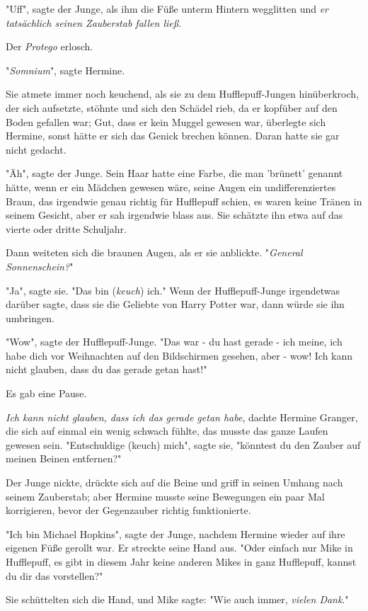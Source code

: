 {"Uff", sagte der Junge, als ihm die Füße unterm Hintern wegglitten und \emph{er tatsächlich seinen Zauberstab fallen ließ}.

Der \emph{Protego} erlosch.

"\emph{Somnium}", sagte Hermine.

Sie atmete immer noch keuchend, als sie zu dem Hufflepuff-Jungen hinüberkroch, der sich aufsetzte, stöhnte und sich den Schädel rieb, da er kopfüber auf den Boden gefallen war; Gut, dass er kein Muggel gewesen war, überlegte sich Hermine, sonst hätte er sich das Genick brechen können. Daran hatte sie gar nicht gedacht.

"Äh", sagte der Junge. Sein Haar hatte eine Farbe, die man 'brünett' genannt hätte, wenn er ein Mädchen gewesen wäre, seine Augen ein undifferenziertes Braun, das irgendwie genau richtig für Hufflepuff schien, es waren keine Tränen in seinem Gesicht, aber er sah irgendwie blass aus. Sie schätzte ihn etwa auf das vierte oder dritte Schuljahr.

Dann weiteten sich die braunen Augen, als er sie anblickte. "\emph{General Sonnenschein?}"

"Ja", sagte sie. "Das bin (\emph{keuch}) ich." Wenn der Hufflepuff-Junge irgendetwas darüber sagte, dass sie die Geliebte von Harry Potter war, dann würde sie ihn umbringen.

"Wow", sagte der Hufflepuff-Junge. "Das war - du hast gerade - ich meine, ich habe dich vor Weihnachten auf den Bildschirmen gesehen, aber - wow! Ich kann nicht glauben, dass du das gerade getan hast!"

Es gab eine Pause.

\emph{Ich kann nicht glauben, dass ich das gerade getan habe}, dachte Hermine Granger, die sich auf einmal ein wenig schwach fühlte, das musste das ganze Laufen gewesen sein. "Entschuldige (keuch) mich", sagte sie, "könntest du den Zauber auf meinen Beinen entfernen?"

Der Junge nickte, drückte sich auf die Beine und griff in seinen Umhang nach seinem Zauberstab; aber Hermine musste seine Bewegungen ein paar Mal korrigieren, bevor der Gegenzauber richtig funktionierte.

"Ich bin Michael Hopkins", sagte der Junge, nachdem Hermine wieder auf ihre eigenen Füße gerollt war. Er streckte seine Hand aus. "Oder einfach nur Mike in Hufflepuff, es gibt in diesem Jahr keine anderen Mikes in ganz Hufflepuff, kannst du dir das vorstellen?"

Sie schüttelten sich die Hand, und Mike sagte: "Wie auch immer, \emph{vielen Dank}."

}

